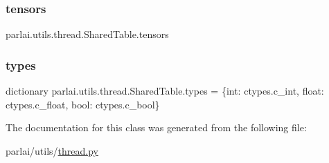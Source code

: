 \subsubsection{\texorpdfstring{tensors}{tensors}}
{\footnotesize\ttfamily parlai.\+utils.\+thread.\+Shared\+Table.\+tensors}

\mbox{\label{classparlai_1_1utils_1_1thread_1_1SharedTable_afe67b490096de733e17e35834a5b55f4}} 
\subsubsection{\texorpdfstring{types}{types}}
{\footnotesize\ttfamily dictionary parlai.\+utils.\+thread.\+Shared\+Table.\+types = \{int\+: ctypes.\+c\+\_\+int, float\+: ctypes.\+c\+\_\+float, bool\+: ctypes.\+c\+\_\+bool\}\hspace{0.3cm}{\ttfamily [static]}}



The documentation for this class was generated from the following file\+:\begin{DoxyCompactItemize}
\item 
parlai/utils/\hyperlink{thread_8py}{thread.\+py}\end{DoxyCompactItemize}
